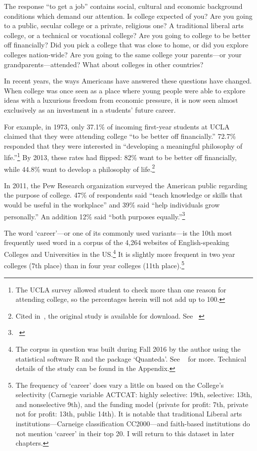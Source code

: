 The response ``to get a job'' contains social, cultural and economic background conditions which demand our attention. Is college expected of you? Are you going to a public, secular college or a private, religious one? A traditional liberal arts college, or a technical or vocational college? Are you going to college to be better off financially? Did you pick a college that was close to home, or did you explore colleges nation-wide? Are you going to the same college your parents---or your grandparents---attended? What about colleges in other countries?

In recent years, the ways Americans have answered these questions have changed. When college was once seen as a place where young people were able to explore ideas with a luxurious freedom from economic pressure, it is now seen almost exclusively as an investment in a students' future career.

For example, in 1973, only 37.1\% of incoming first-year students at UCLA claimed that they were attending college ``to be better off financially.'' 72.7\% responded that they were interested in ``developing a meaningful philosophy of life.''\footnote{The UCLA survey allowed student to check more than one reason for attending college, so the percentages herein will not add up to 100.} By 2013, these rates had flipped: 82\% want to be better off financially, while 44.8\% want to develop a philosophy of life.\footnote{Cited in~\citep{Berrett:2015ui}, the original study is available for download. See ~\citep{Eagen:2016vk}}

In 2011, the Pew Research organization surveyed the American public regarding the purpose of college. 47\% of respondents said ``teach knowledge or skills that would be useful in the workplace'' and 39\% said ``help individuals grow personally.'' An addition 12\% said ``both purposes equally.''\footnote{~\citep{PewResearchCenter:2011vl}} 

The word `career'---or one of its commonly used variants---is the 10th most frequently used word in a corpus of the 4,264 websites of English-speaking Colleges and Universities in the US.\footnote{The corpus in question was built during Fall 2016 by the author using the statistical software R and the package `Quanteda'. See ~\citep{Packagequanteda:wb} for more. Technical details of the study can be found in the Appendix.} It is slightly more frequent in two year colleges (7th place) than in four year colleges (11th place).\footnote{The frequency of `career' does vary a little on based on the College's selectivity (Carnegie variable ACTCAT: highly selective: 19th, selective: 13th, and nonselective 9th), and the funding model (private for profit: 7th, private not for profit: 13th, public 14th). It is notable that traditional Liberal arts institutions---Carneige classification CC2000---and faith-based institutions do not mention `career' in their top 20. I will return to this dataset in later chapters.}

